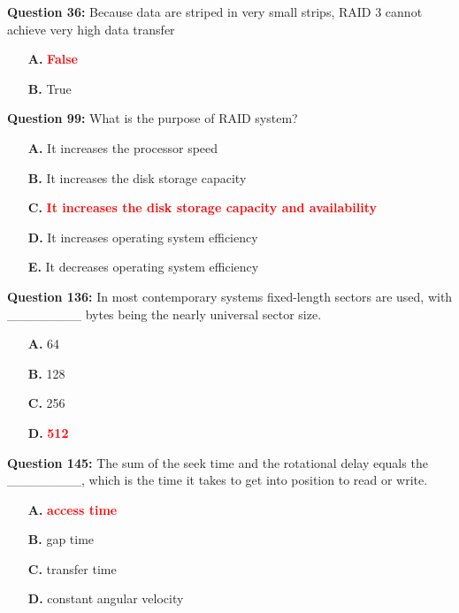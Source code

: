 \documentclass[12pt,a4paper]{article}
\begin{document}
\vspace{0.5cm}

\textbf{Question 36:} Because data are striped in very small strips, RAID 3 cannot achieve very high data transfer

\begin{itemize}
    \item[\textbf{A.}] \textcolor{red}{\textbf{False}}
    \item[\textbf{B.}] True
\end{itemize}

\vspace{0.5cm}

\textbf{Question 99:} What is the purpose of RAID system?

\begin{itemize}
    \item[\textbf{A.}] It increases the processor speed
    \item[\textbf{B.}] It increases the disk storage capacity
    \item[\textbf{C.}] \textcolor{red}{\textbf{It increases the disk storage capacity and availability}}
    \item[\textbf{D.}] It increases operating system efficiency
    \item[\textbf{E.}] It decreases operating system efficiency
\end{itemize}

\vspace{0.5cm}

\textbf{Question 136:} In most contemporary systems fixed-length sectors are used, with ________ bytes being the nearly universal sector size.

\begin{itemize}
    \item[\textbf{A.}] 64
    \item[\textbf{B.}] 128
    \item[\textbf{C.}] 256
    \item[\textbf{D.}] \textcolor{red}{\textbf{512}}
\end{itemize}

\vspace{0.5cm}

\textbf{Question 145:} The sum of the seek time and the rotational delay equals the ________, which is the time it takes to get into position to read or write.

\begin{itemize}
    \item[\textbf{A.}] \textcolor{red}{\textbf{access time}}
    \item[\textbf{B.}] gap time
    \item[\textbf{C.}] transfer time
    \item[\textbf{D.}] constant angular velocity
\end{itemize}
\end{document}
